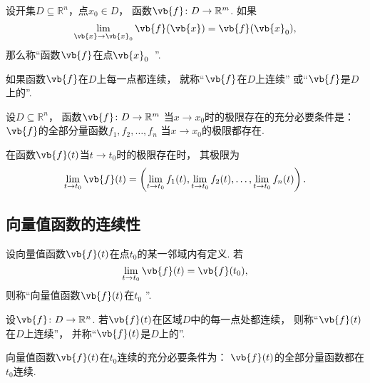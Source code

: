 \begin{definition}
设开集\(D \subseteq \mathbb{R}^n\)，点\(x_0 \in D\)，
函数\(\vb{f}\colon D \to \mathbb{R}^m\).
如果\begin{equation*}
	\lim_{\vb{x}\to\vb{x}_0} \vb{f}(\vb{x})
	= \vb{f}(\vb{x}_0),
\end{equation*}
那么称“函数\(\vb{f}\)在点\(\vb{x}_0\)~”.

如果函数\(\vb{f}\)在\(D\)上每一点都连续，
就称“\(\vb{f}\)在\(D\)上连续”
或“\(\vb{f}\)是\(D\)上的”.
\end{definition}

\begin{theorem}
设\(D \subseteq \mathbb{R}^n\)，
函数\(\vb{f}\colon D \to \mathbb{R}^m\)
当\(x \to x_0\)时的极限存在的充分必要条件是：
\(\vb{f}\)的全部分量函数\(f_1,f_2,\dotsc,f_n\)
当\(x \to x_0\)的极限都存在.
\end{theorem}

\begin{theorem}
在函数\(\vb{f}(t)\)当\(t \to t_0\)时的极限存在时，
其极限为\begin{equation}\label{equation:一元实变向量值函数.向量值函数的极限与分量函数的极限的关系}
	\lim_{t \to t_0} \vb{f}(t)
	= \left(
			\lim_{t \to t_0} f_1(t),
			\lim_{t \to t_0} f_2(t),
			\dotsc,
			\lim_{t \to t_0} f_n(t)
		\right).
\end{equation}
\end{theorem}

\subsection{向量值函数的连续性}
\begin{definition}
设向量值函数\(\vb{f}(t)\)在点\(t_0\)的某一邻域内有定义.
若\begin{equation*}
	\lim_{t \to t_0} \vb{f}(t) = \vb{f}(t_0),
\end{equation*}
则称“向量值函数\(\vb{f}(t)\)在\(t_0\) ”.
\end{definition}

\begin{definition}
设\(\vb{f}\colon D\to\mathbb{R}^n\).
若\(\vb{f}(t)\)在区域\(D\)中的每一点处都连续，
则称“\(\vb{f}(t)\)在\(D\)上连续”，
并称“\(\vb{f}(t)\)是\(D\)上的”.
\end{definition}

\begin{theorem}
向量值函数\(\vb{f}(t)\)在\(t_0\)连续的充分必要条件为：
\(\vb{f}(t)\)的全部分量函数都在\(t_0\)连续.
\end{theorem}

